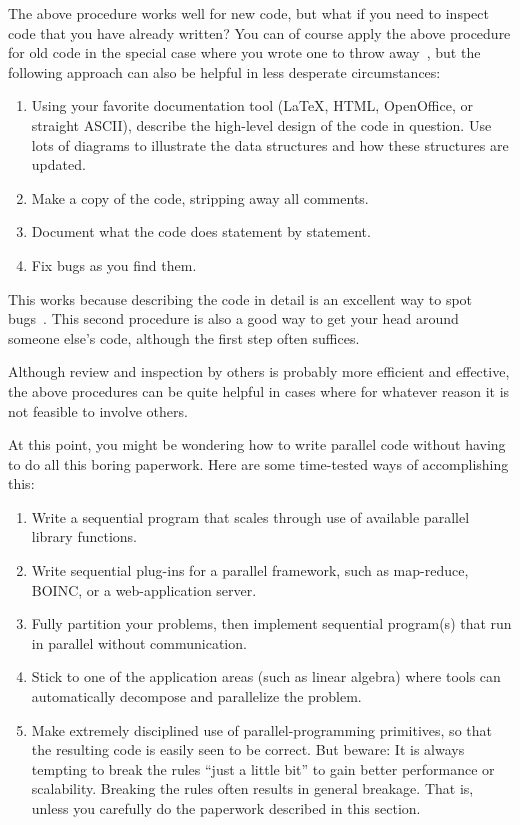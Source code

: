 The above procedure works well for new code, but what if you need to
inspect code that you have already written?
You can of course apply the above procedure for old code in the special
case where you wrote one to throw away~\cite{Brooks79},
but the following approach can also be helpful in less desperate
circumstances:

\begin{enumerate}
\item	Using your favorite documentation tool (\LaTeX{}, HTML,
	OpenOffice, or straight ASCII), describe the high-level
	design of the code in question.
	Use lots of diagrams to illustrate the data structures
	and how these structures are updated.
\item	Make a copy of the code, stripping away all comments.
\item	Document what the code does statement by statement.
\item	Fix bugs as you find them.
\end{enumerate}

This works because describing the code in detail is an excellent way to spot
bugs~\cite{GlenfordJMyers1979}.
This second procedure is also a good way to get your head around
someone else's code, although the first step often suffices.

Although review and inspection by others is probably more efficient and
effective, the above procedures can be quite helpful in cases where
for whatever reason it is not feasible to involve others.

At this point, you might be wondering how to write parallel code without
having to do all this boring paperwork.
Here are some time-tested ways of accomplishing this:

\begin{enumerate}
\item	Write a sequential program that scales through use of
	available parallel library functions.
\item	Write sequential plug-ins for a parallel framework,
	such as map-reduce, BOINC, or a web-application server.
\item	Fully partition your problems, then implement sequential
	program(s) that run in parallel without communication.
\item	Stick to one of the application areas (such as linear algebra)
	where tools can automatically decompose and parallelize
	the problem.
\item	Make extremely disciplined use of parallel-programming
	primitives, so that the resulting code is easily seen to be correct.
	But beware: It is always tempting to break the rules
	``just a little bit'' to gain better performance or
	scalability.
	Breaking the rules often results in general breakage.
	That is, unless you carefully do the paperwork described in this
	section.
\end{enumerate}

